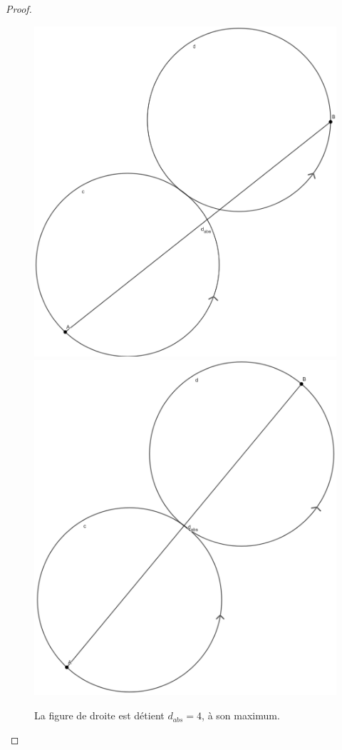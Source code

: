 \documentclass{amsart}
\theoremstyle{definition}
\theoremstyle{remark}
\numberwithin{equation}{section}
\begin{document}
\begin{proof}
  \begin{figure}[H]
    \centering
    \includegraphics[scale=0.15,valign=t]{images/2_worst.png}
    \includegraphics[scale=0.15,valign=t]{images/2.png}
    \caption{La figure de droite est détient $d_{abs}=4$, à son maximum.}
  \end{figure}


\end{proof}
\end{document}
